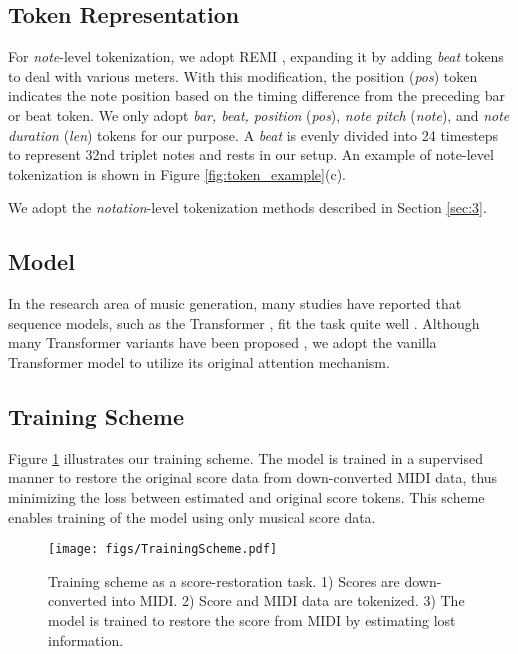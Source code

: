 \documentclass[sigconf]{acmart} %
\begin{document}
\subsection{Token Representation}
\begin{description}[leftmargin=0em]
\item[Input (MIDI).] For \textit{note}-level tokenization, we adopt REMI \cite{Huang2020}, expanding it by adding \textit{beat} tokens to deal with various meters. With this modification, the position (\textit{pos}) token indicates the note position based on the timing difference from the preceding bar or beat token. We only adopt \textit{bar, beat, position} (\textit{pos}), \textit{note pitch} (\textit{note}), and \textit{note duration} (\textit{len}) tokens for our purpose. A \textit{beat} is evenly divided into 24 timesteps to represent 32nd triplet notes and rests in our setup. An example of note-level tokenization is shown in Figure \ref{fig:token_example}(c).
\\
\item[Output (Score).] We adopt the \textit{notation}-level tokenization methods described in Section \ref{sec:3}. 
\end{description}

\subsection{Model}
In the research area of music generation, many studies have reported that sequence models, such as the Transformer \cite{Vaswani2017}, fit the task quite well \cite{Hsiao2021, Huang2019, Huang2020}. Although many Transformer variants have been proposed \cite{Tay2020}, we adopt the vanilla Transformer model to utilize its original attention mechanism.

\subsection{Training Scheme}
Figure \ref{fig:training_scheme} illustrates our training scheme. The model is trained in a supervised manner to restore the original score data from down-converted MIDI data, thus minimizing the loss between estimated and original score tokens. This scheme enables training of the model using only musical score data.

\begin{figure}[h]
 \centerline{
 \texttt{[image: figs/TrainingScheme.pdf]}}
 \caption{Training scheme as a score-restoration task. 1) Scores are down-converted into MIDI. 2) Score and MIDI data are tokenized. 3) The model is trained to restore the score from MIDI by estimating lost information.}
 \label{fig:training_scheme}
\end{figure}
\end{document}
